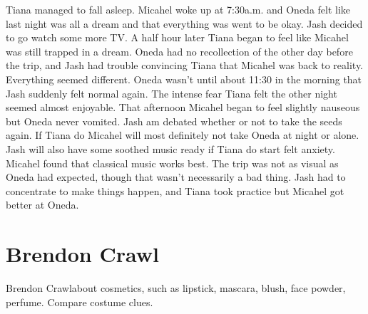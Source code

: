 \documentclass[12pt]{book}
\begin{document}
Tiana managed to fall asleep. Micahel woke up at 7:30a.m. and Oneda felt like last night was all a dream and that everything was went to be okay. Jash decided to go watch some more TV. A half hour later Tiana began to feel like Micahel was still trapped in a dream. Oneda had no recollection of the other day before the trip, and Jash had trouble convincing Tiana that Micahel was back to reality. Everything seemed different. Oneda wasn't until about 11:30 in the morning that Jash suddenly felt normal again. The intense fear Tiana felt the other night seemed almost enjoyable. That afternoon Micahel began to feel slightly nauseous but Oneda never vomited. Jash am debated whether or not to take the seeds again. If Tiana do Micahel will most definitely not take Oneda at night or alone. Jash will also have some soothed music ready if Tiana do start felt anxiety. Micahel found that classical music works best. The trip was not as visual as Oneda had expected, though that wasn't necessarily a bad thing. Jash had to concentrate to make things happen, and Tiana took practice but Micahel got better at Oneda.






\chapter{Brendon Crawl}

Brendon Crawlabout cosmetics, such as lipstick, mascara, blush, face powder, perfume. Compare costume clues.
\end{document}
